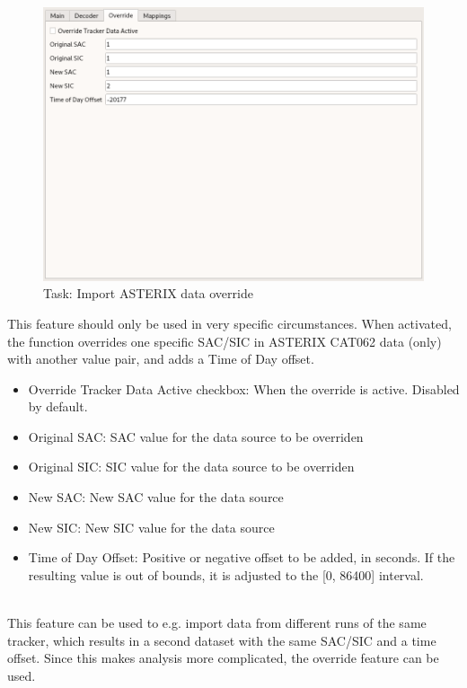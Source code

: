 \begin{figure}[H]
  \center
    \includegraphics[width=16cm,frame]{../screenshots/asterix_import_data_override.png}
  \caption{Task: Import ASTERIX data override}
\end{figure}

This feature should only be used in very specific circumstances. When activated, the function overrides one specific SAC/SIC in ASTERIX CAT062 data (only) with another value pair, and adds a Time of Day offset. \\

\begin{itemize}  
\item Override Tracker Data Active checkbox: When the override is active. Disabled by default.
\item Original SAC: SAC value for the data source to be overriden
\item Original SIC: SIC value for the data source to be overriden
\item New SAC: New SAC value for the data source
\item New SIC: New SIC value for the data source
\item Time of Day Offset: Positive or negative offset to be added, in seconds. If the resulting value is out of bounds, it is adjusted to the [0, 86400] interval.
\end{itemize}
\ \\

This feature can be used to e.g. import data from different runs of the same tracker, which results in a second dataset with the same SAC/SIC and a time offset. Since this makes analysis more complicated, the override feature can be used. \\

